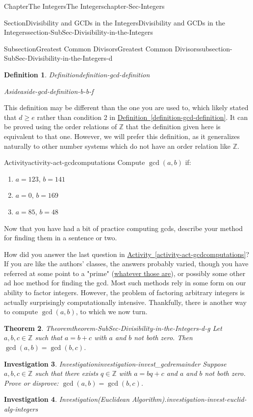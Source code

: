 \documentclass[oneside,10pt,]{book}
\newcommand{\xreffont}{\relax}
\numberwithin{equation}{section}
\renewcommand{\ge}{\geqslant}
\def\Z{{\mathbb Z}}
\newtheorem{theorem}{Theorem}[section]
\newtheorem{definition}[theorem]{Definition}
\newtheorem{investigation}[theorem]{Investigation}
\begin{document}
\begin{chapterptx}{Chapter}{The Integers}{}{The Integers}{}{}{chapter-Sec-Integers}
\begin{sectionptx}{Section}{Divisibility and GCDs in the Integers}{}{Divisibility and GCDs in the Integers}{}{}{section-SubSec-Divisibility-in-the-Integers}
\begin{subsectionptx}{Subsection}{Greatest Common Divisors}{}{Greatest Common Divisors}{}{}{subsection-SubSec-Divisibility-in-the-Integers-d}
\begin{definition}{Definition}{}{definition-gcd-definition}
\begin{aside}{Aside}{}{aside-gcd-definition-b-b-f}
\end{aside}
%
\end{definition}
%
This definition may be different than the one you are used to, which likely stated that \(d \ge e\) rather than condition 2 in \hyperref[definition-gcd-definition]{Definition~{\xreffont\ref{definition-gcd-definition}}}. It can be proved using the order relations of \(\Z\) that the definition given here is equivalent to that one. However, we will prefer this definition, as it generalizes naturally to other number systems which do not have an order relation like \(\Z\).%
\begin{activity}{Activity}{}{activity-act-gcdcomputations}%
Compute \(\gcd(a,b)\) if:%
\begin{enumerate}
\item{}\(a = 123\), \(b = 141\)%
\item{}\(a = 0\), \(b = 169\)%
\item{}\(a= 85\), \(b = 48\)%
\end{enumerate}
Now that you have had a bit of practice computing gcds, describe your method for finding them in a sentence or two.%
\end{activity}%
How did you answer the last question in \hyperref[activity-act-gcdcomputations]{Activity~{\xreffont\ref{activity-act-gcdcomputations}}}? If you are like the authors' classes, the answers probably varied, though you have referred at some point to a "prime" (\hyperref[definition-def-primeinteger]{whatever those are}), or possibly some other ad hoc method for finding the gcd. Most such methods rely in some form on our ability to factor integers. However, the problem of factoring arbitrary integers is actually surprisingly computationally intensive. Thankfully, there is another way to compute \(\gcd(a,b)\), to which we now turn.%
\begin{theorem}{Theorem}{}{}{theorem-SubSec-Divisibility-in-the-Integers-d-g}%
Let \(a,b,c\in\Z\) such that \(a = b+c\) with \(a\) and \(b\) not both zero. Then \(\gcd(a,b) = \gcd(b,c)\).%
\end{theorem}
\begin{investigation}{Investigation}{}{investigation-invest_gcdremainder}%
Suppose \(a,b,c\in\Z\) such that there exists \(q\in\Z\) with \(a = bq + c\) and \(a\) and \(b\) not both zero. Prove or disprove: \(\gcd(a,b)=\gcd(b,c)\).%
\end{investigation}%
\begin{investigation}{Investigation}{(Euclidean Algorithm).}{investigation-invest-euclid-alg-integers}%

\end{investigation}
\end{subsectionptx}
\end{sectionptx}
\end{chapterptx}
\end{document}
